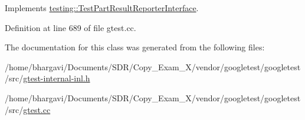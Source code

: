 Implements \hyperlink{classtesting_1_1_test_part_result_reporter_interface_aa2f920e7a5a0a6d0faf19e3727928c22}{testing\+::\+Test\+Part\+Result\+Reporter\+Interface}.



Definition at line 689 of file gtest.\+cc.



The documentation for this class was generated from the following files\+:\begin{DoxyCompactItemize}
\item 
/home/bhargavi/\+Documents/\+S\+D\+R/\+Copy\+\_\+\+Exam\+\_\+X/vendor/googletest/googletest/src/\hyperlink{gtest-internal-inl_8h}{gtest-\/internal-\/inl.\+h}\item 
/home/bhargavi/\+Documents/\+S\+D\+R/\+Copy\+\_\+\+Exam\+\_\+X/vendor/googletest/googletest/src/\hyperlink{gtest_8cc}{gtest.\+cc}\end{DoxyCompactItemize}
